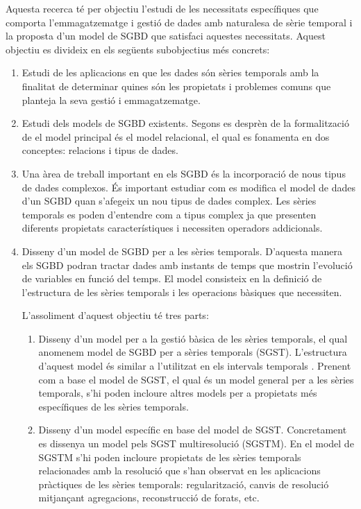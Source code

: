 Aquesta recerca té per objectiu l'estudi de les necessitats
específiques que comporta l'emmagatzematge i gestió de dades amb
naturalesa de sèrie temporal i la proposta d'un model de SGBD que
satisfaci aquestes necessitats. Aquest objectiu es divideix en els
següents subobjectius més concrets:

\begin{enumerate}

\item Estudi de les aplicacions en que les dades són sèries temporals
  amb la finalitat de determinar quines són les propietats i problemes
  comuns que planteja la seva gestió i emmagatzematge.

\item Estudi dels models de SGBD existents. Segons es desprèn de la
  formalització de \textcite{date:introduction} el model principal és
  el model relacional, el qual es fonamenta en dos conceptes:
  relacions i tipus de dades. 

\item Una àrea de treball important en els SGBD és la incorporació de
  nous tipus de dades complexos. És important estudiar com es modifica
  el model de dades d'un SGBD quan s'afegeix un nou tipus de dades
  complex.  Les sèries temporals es poden d'entendre com a tipus
  complex ja que presenten diferents propietats característiques i
  necessiten operadors addicionals.  

\item Disseny d'un model de SGBD per a les sèries temporals. D'aquesta
  manera els SGBD podran tractar dades amb instants de temps que
  mostrin l'evolució de variables en funció del temps. El model
  consisteix en la definició de l'estructura de les sèries temporals i
  les operacions bàsiques que necessiten.

  L'assoliment d'aquest objectiu té tres parts:

  \begin{enumerate}
  \item Disseny d'un model per a la gestió bàsica de les sèries
    temporals, el qual anomenem model de SGBD per a sèries temporals
    (SGST).  L'estructura d'aquest model és similar a l'utilitzat en
    els intervals
    temporals \parencite{date02:_tempor_data_relat_model}.  Prenent
    com a base el model de SGST, el qual és un model general per a les
    sèries temporals, s'hi poden incloure altres models per a
    propietats més específiques de les sèries temporals.

  \item Disseny d'un model específic en base del model de
    SGST. Concretament es dissenya un model pels SGST multiresolució
    (SGSTM).  En el model de SGSTM s'hi poden incloure propietats de
    les sèries temporals relacionades amb la resolució que s'han
    observat en les aplicacions pràctiques de les sèries temporals:
    regularització, canvis de resolució mitjançant agregacions,
    reconstrucció de forats, etc.
 

\end{enumerate}
\end{enumerate}
